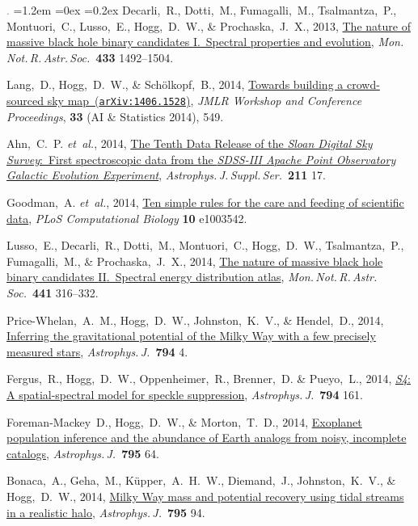 \documentclass[10pt,letterpaper]{article}
\newcommand{\acronym}[1]{{\small{#1}}}
\newcommand{\foreign}[1]{\textsl{#1}}
\newcommand{\etal}{\foreign{et~al.}}
\newcommand{\project}[1]{\textsl{#1}}
\newcommand{\doi}[2]{\href{http://dx.doi.org/#1}{{#2}}}
\newcommand{\arxiv}[2]{\href{http://arxiv.org/abs/#1}{{#2}\ (\texttt{arXiv:#1})}}
\newcommand{\deemph}[1]{\textcolor{grey}{\footnotesize{#1}}}
\newcommand{\pubnumber}[1]{\deemph{{#1}.}}
\newcounter{refpubnum}
\newcommand{\hogglist}{%
    \rightmargin=0in
    \leftmargin=1.2em
    \topsep=0ex
    \partopsep=0pt
    \itemsep=0.2ex
    \parsep=0pt
    \itemindent=-1.0\leftmargin
    \listparindent=0.0\leftmargin
    \settowidth{\labelsep}{~}
    \usecounter{refpubnum}
  }
\begin{document}
\begin{list}{\pubnumber{\therefpubnum}}{\hogglist}
Decarli,~R., Dotti,~M., Fumagalli,~M., Tsalmantza,~P., Montuori,~C., Lusso,~E.,
Hogg,~D.~W., \& Prochaska,~J.~X., 2013,
\doi{10.1093/mnras/stt831}{The nature of massive black hole binary candidates \acronym{I}.\ Spectral properties and evolution},
\textit{Mon.\,Not.\,R.\,Astr.\,Soc.}\ \textbf{433} 1492--1504.
\item
Lang,~D., Hogg,~D.~W., \& Sch\"olkopf,~B., 2014,
\arxiv{1406.1528}{Towards building a crowd-sourced sky map},
\textit{JMLR Workshop and Conference Proceedings}, \textbf{33} (AI \& Statistics 2014), 549.
\item
Ahn,~C.~P. \etal, 2014,
\doi{10.1088/0067-0049/211/2/17}{The Tenth Data Release of the \project{Sloan Digital Sky Survey}:\ First spectroscopic data from the \project{\acronym{SDSS-III} Apache Point Observatory Galactic Evolution Experiment}},
\textit{Astrophys.\,J.\,Suppl.\,Ser.}\ \textbf{211} 17.
\item
Goodman,~A. \etal, 2014,
\doi{10.1371/journal.pcbi.1003542}{Ten simple rules for the care and feeding of scientific data},
\textit{PLoS Computational Biology} \textbf{10} e1003542.
\item
Lusso,~E., Decarli,~R., Dotti,~M., Montuori,~C., Hogg,~D.~W.,
Tsalmantza,~P., Fumagalli,~M., \& Prochaska,~J.~X., 2014,
\doi{10.1093/mnras/stu572}{The nature of massive black hole binary candidates \acronym{II}.\ Spectral energy distribution atlas},
\textit{Mon.\,Not.\,R.\,Astr.\,Soc.}\ \textbf{441} 316--332.
\item
Price-Whelan,~A.~M., Hogg,~D.~W., Johnston,~K.~V., \& Hendel,~D., 2014,
\doi{10.1088/0004-637X/794/1/4}{Inferring the gravitational potential of the Milky Way with a few precisely measured stars},
\textit{Astrophys.\,J.}\ \textbf{794} 4.
\item
Fergus,~R., Hogg,~D.~W., Oppenheimer,~R., Brenner,~D. \& Pueyo,~L., 2014,
\doi{10.1088/0004-637X/794/2/161}{\project{S4}: A spatial-spectral model for speckle suppression},
\textit{Astrophys.\,J.}\ \textbf{794} 161.
\item
Foreman-Mackey~D., Hogg,~D.~W., \& Morton,~T.~D., 2014,
\doi{10.1088/0004-637X/795/1/64}{Exoplanet population inference and the abundance of Earth analogs from noisy, incomplete catalogs},
\textit{Astrophys.\,J.}\ \textbf{795} 64.
\item
Bonaca,~A., Geha,~M., K\"upper,~A.~H.~W., Diemand,~J., Johnston,~K.~V., \& Hogg,~D.~W., 2014,
\doi{10.1088/0004-637X/795/1/94}{Milky Way mass and potential recovery using tidal streams in a realistic halo},
\textit{Astrophys.\,J.}\ \textbf{795} 94.

\end{list}
\end{document}

